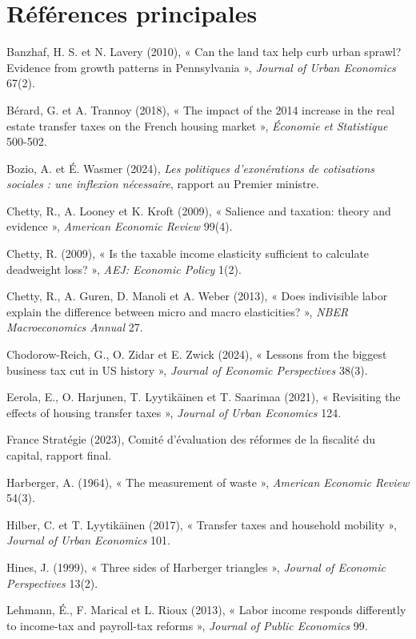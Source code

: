 \documentclass[10pt,a4paper]{article}
\begin{document}
\section{Références principales}\label{ann:refs}
{\small\setlength{\parskip}{2pt}
Banzhaf, H. S. et N. Lavery (2010), « Can the land tax help curb urban sprawl? Evidence from growth patterns in
Pennsylvania », \emph{Journal of Urban Economics} 67(2). \par
Bérard, G. et A. Trannoy (2018), « The impact of the 2014 increase in the real estate transfer taxes on the French
housing market », \emph{Économie et Statistique} 500-502. \par
Bozio, A. et É. Wasmer (2024), \emph{Les politiques d'exonérations de cotisations sociales : une inflexion
nécessaire}, rapport au Premier ministre. \par
Chetty, R., A. Looney et K. Kroft (2009), « Salience and taxation: theory and evidence », \emph{American Economic
Review} 99(4). \par
Chetty, R. (2009), « Is the taxable income elasticity sufficient to calculate deadweight loss? », \emph{AEJ: Economic
Policy} 1(2). \par
Chetty, R., A. Guren, D. Manoli et A. Weber (2013), « Does indivisible labor explain the difference between micro and
macro elasticities? », \emph{NBER Macroeconomics Annual} 27. \par
Chodorow-Reich, G., O. Zidar et E. Zwick (2024), « Lessons from the biggest business tax cut in US history »,
\emph{Journal of Economic Perspectives} 38(3). \par
Eerola, E., O. Harjunen, T. Lyytikäinen et T. Saarimaa (2021), « Revisiting the effects of housing transfer taxes »,
\emph{Journal of Urban Economics} 124. \par
France Stratégie (2023), Comité d'évaluation des réformes de la fiscalité du capital, rapport final. \par
Harberger, A. (1964), « The measurement of waste », \emph{American Economic Review} 54(3). \par
Hilber, C. et T. Lyytikäinen (2017), « Transfer taxes and household mobility », \emph{Journal of Urban Economics} 101.
\par
Hines, J. (1999), « Three sides of Harberger triangles », \emph{Journal of Economic Perspectives} 13(2). \par
Lehmann, É., F. Marical et L. Rioux (2013), « Labor income responds differently to income-tax and payroll-tax reforms »,
\emph{Journal of Public Economics} 99. \par
}
\end{document}
